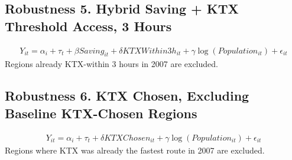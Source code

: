 \documentclass[a4paper, 10pt]{article}
\begin{document}
\begin{table}[H]
\centering
\caption{Robustness 4. KTX Threshold Access, 3 Hours: 의사}

\end{table}

\subsection{Robustness 5. Hybrid Saving + KTX Threshold Access, 3 Hours}
\begin{align*}
    Y_{it}=\alpha_i+\tau_t+\beta Saving_{it}+\delta KTXWithin3h_{it}+\gamma\log(Population_{it})+\epsilon_{it}
\end{align*}
Regions already KTX-within 3 hours in 2007 are excluded.
\begin{table}[H]
\centering
\caption{Robustness 5. Hybrid Saving + KTX Threshold Access, 3 Hours: 의원}

\end{table}

\begin{table}[H]
\centering
\caption{Robustness 5. Hybrid Saving + KTX Threshold Access, 3 Hours: 병원}

\end{table}

\begin{table}[H]
\centering
\caption{Robustness 5. Hybrid Saving + KTX Threshold Access, 3 Hours: 종합병원}

\end{table}

\begin{table}[H]
\centering
\caption{Robustness 5. Hybrid Saving + KTX Threshold Access, 3 Hours: 상급종합병원}

\end{table}

\begin{table}[H]
\centering
\caption{Robustness 5. Hybrid Saving + KTX Threshold Access, 3 Hours: 의사}

\end{table}

\subsection{Robustness 6. KTX Chosen, Excluding Baseline KTX-Chosen Regions}
\begin{align*}
    Y_{it}=\alpha_i+\tau_t+\delta KTXChosen_{it}+\gamma\log(Population_{it})+\epsilon_{it}
\end{align*}
Regions where KTX was already the fastest route in 2007 are excluded.
\begin{table}[H]
\centering
\caption{Robustness 6. KTX Chosen, Excluding Baseline KTX-Chosen Regions: 의원}

\end{table}
\end{document}
